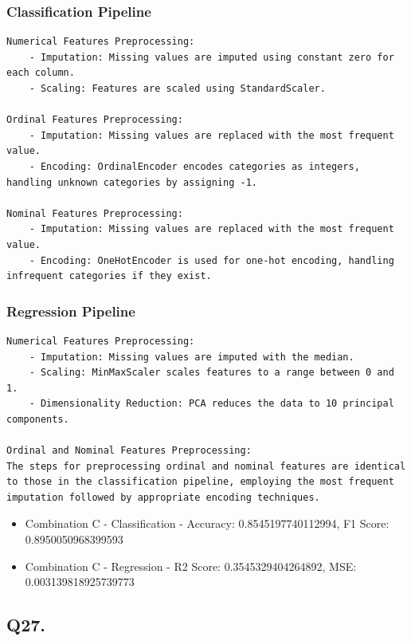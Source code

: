 \documentclass{article}
\begin{document}
\subsubsection*{Classification Pipeline}

\begin{lstlisting}
Numerical Features Preprocessing:
    - Imputation: Missing values are imputed using constant zero for each column.
    - Scaling: Features are scaled using StandardScaler.

Ordinal Features Preprocessing:
    - Imputation: Missing values are replaced with the most frequent value.
    - Encoding: OrdinalEncoder encodes categories as integers, handling unknown categories by assigning -1.

Nominal Features Preprocessing:
    - Imputation: Missing values are replaced with the most frequent value.
    - Encoding: OneHotEncoder is used for one-hot encoding, handling infrequent categories if they exist.

\end{lstlisting}

\subsubsection*{Regression Pipeline}

\begin{lstlisting}
Numerical Features Preprocessing:
    - Imputation: Missing values are imputed with the median.
    - Scaling: MinMaxScaler scales features to a range between 0 and 1.
    - Dimensionality Reduction: PCA reduces the data to 10 principal components.

Ordinal and Nominal Features Preprocessing:
The steps for preprocessing ordinal and nominal features are identical to those in the classification pipeline, employing the most frequent imputation followed by appropriate encoding techniques.

\end{lstlisting}

\begin{itemize}
\item Combination C - Classification - Accuracy: 0.8545197740112994, F1 Score: 0.8950050968399593
\item Combination C - Regression - R2 Score: 0.3545329404264892, MSE: 0.003139818925739773
\end{itemize}

\subsection*{Q27.}
\end{document}
